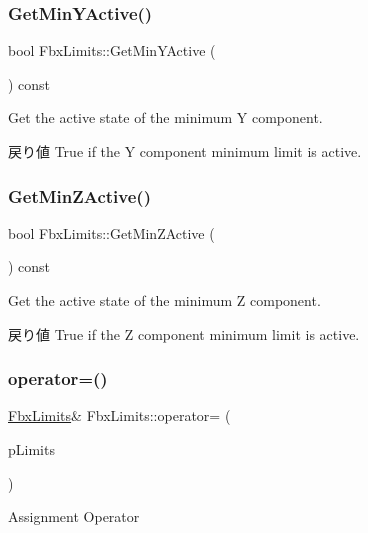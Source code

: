 \subsubsection{\texorpdfstring{Get\+Min\+Y\+Active()}{GetMinYActive()}}
{\footnotesize\ttfamily bool Fbx\+Limits\+::\+Get\+Min\+Y\+Active (\begin{DoxyParamCaption}{ }\end{DoxyParamCaption}) const}

Get the active state of the minimum Y component. \begin{DoxyReturn}{戻り値}
True if the Y component minimum limit is active. 
\end{DoxyReturn}
\mbox{\label{class_fbx_limits_afd07bd7e174be42570ce976146bbba48}} 
\subsubsection{\texorpdfstring{Get\+Min\+Z\+Active()}{GetMinZActive()}}
{\footnotesize\ttfamily bool Fbx\+Limits\+::\+Get\+Min\+Z\+Active (\begin{DoxyParamCaption}{ }\end{DoxyParamCaption}) const}

Get the active state of the minimum Z component. \begin{DoxyReturn}{戻り値}
True if the Z component minimum limit is active. 
\end{DoxyReturn}
\mbox{\label{class_fbx_limits_ae59422fb31755035d02b272e74b9e518}} 
\subsubsection{\texorpdfstring{operator=()}{operator=()}}
{\footnotesize\ttfamily \hyperlink{class_fbx_limits}{Fbx\+Limits}\& Fbx\+Limits\+::operator= (\begin{DoxyParamCaption}\item[{const \hyperlink{class_fbx_limits}{Fbx\+Limits} \&}]{p\+Limits }\end{DoxyParamCaption})}



Assignment Operator 

